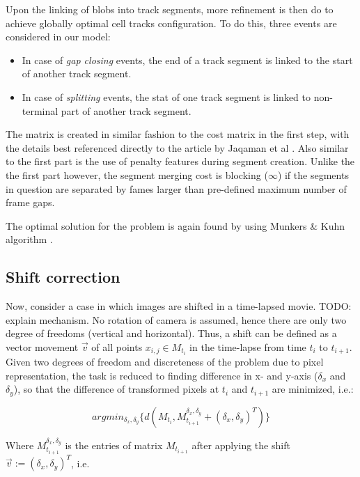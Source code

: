 \documentclass[pdftex,12pt,a4paper]{report}
\begin{document}
Upon the linking of blobs into track segments, more refinement is then do to achieve globally optimal cell tracks configuration. To do this, three events are considered in our model:

\begin{itemize}
\item In case of \textit{gap closing} events, the end of a track segment is linked to the start of another track segment.
\item In case of \textit{splitting} events, the stat of one track segment is linked to non-terminal part of another track segment.
\end{itemize}

The matrix is created in similar fashion to the cost matrix in the first step, with the details best referenced directly to the article by Jaqaman et al \cite{jaqaman2008robust}. Also similar to the first part is the use of penalty features during segment creation. Unlike the the first part however, the segment merging cost is blocking ($\infty$) if the segments in question are separated by fames larger than pre-defined maximum number of frame gaps.

The optimal solution for the problem is again found by using Munkers \& Kuhn algorithm \cite{munkres1957algorithms}.

\subsection{Shift correction}


Now, consider a case in which images are shifted in a time-lapsed movie. TODO: explain mechanism. No rotation of camera is assumed, hence there are only two degree of freedoms (vertical and horizontal). Thus, a shift can be defined as a vector movement $\vec{v}$ of all points $x_{i,j} \in M_{t_i}$ in the time-lapse from time $t_i$ to $t_{i+1}$. Given two degrees of freedom and discreteness of the problem due to pixel representation, the task is reduced to finding difference in x- and y-axis ($\delta_x$ and $\delta_y$), so that the difference of transformed pixels at $t_i$ and $t_{i+1}$ are minimized, i.e.:

$$
argmin_{\delta_x, \delta_y} \{d(M_{t_i}, M_{t_{i+1}}^{\delta_x, \delta_y} + (\delta_x, \delta_y)^T)\}
$$

Where $M_{t_{i+1}}^{\delta_x, \delta_y}$ is the entries of matrix $M_{t_{i+1}}$ after applying the shift $\vec{v} := (\delta_x, \delta_y)^T$, i.e.
\end{document}
